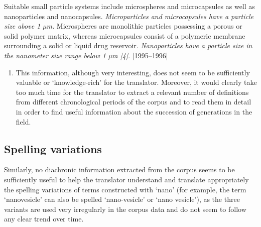 \documentclass[output=paper]{langscibook}
\begin{document}
\ea%
    \label{ex:key:22}
         Suitable small particle systems include microspheres and microcapsules as well as nanoparticles and nanocapsules. \textit{Microparticles and microcapsules have a particle size above 1 µm.} Microspheres are monolithic particles possessing a porous or solid polymer matrix, whereas microcapsules consist of a polymeric membrane surrounding a solid or liquid drug reservoir. \textit{Nanoparticles have a particle size in the nanometer size range below 1 µm [4]}. [1995–1996]
\z

\begin{enumerate}
\item   This information, although very interesting, does not seem to be sufficiently valuable or ‘knowledge-rich’ for the translator. Moreover, it would clearly take too much time for the translator to extract a relevant number of definitions from different chronological periods of the corpus and to read them in detail in order to find useful information about the succession of generations in the field.
\end{enumerate}

\subsection{Spelling variations}\label{sec:cuchet:4.2}

Similarly, no diachronic information extracted from the corpus seems to be sufficiently useful to help the translator understand and translate appropriately the spelling variations of terms constructed with ‘nano’ (for example, the term ‘nanovesicle’ can also be spelled ‘nano-vesicle’ or ‘nano vesicle’), as the three variants are used very irregularly in the corpus data and do not seem to follow any clear trend over time.
\end{document}
